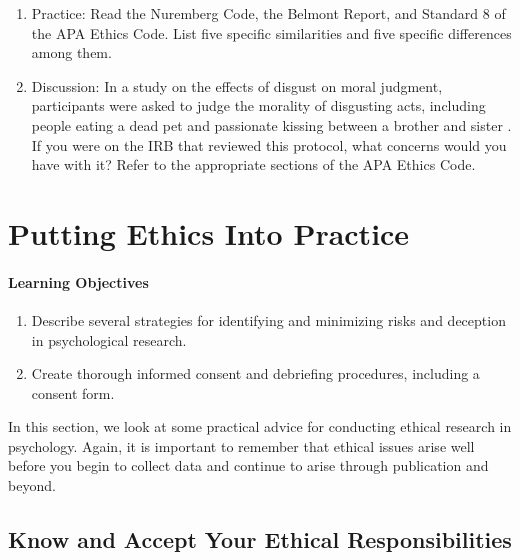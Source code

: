 \begin{fullwidth}

\begin{enumerate}

\item Practice: Read the Nuremberg Code, the Belmont Report, and Standard 8 of the APA Ethics Code. List five specific similarities and five specific differences among them.

\item Discussion: In a study on the effects of disgust on moral judgment, participants were asked to judge the morality of disgusting acts, including people eating a dead pet and passionate kissing between a brother and sister \citep{haidt_affect_1993}. If you were on the IRB that reviewed this protocol, what concerns would you have with it? Refer to the appropriate sections of the APA Ethics Code.

\end{enumerate}

\end{fullwidth}

\newpage
\section{Putting Ethics Into Practice}

  \paragraph{Learning Objectives}
  \begin{enumerate}
  \item Describe several strategies for identifying and minimizing risks and deception in psychological research.
   \item Create thorough informed consent and debriefing procedures, including a consent form.
  \end{enumerate}


In this section, we look at some practical advice for conducting ethical research in psychology. Again, it is important to remember that ethical issues arise well before you begin to collect data and continue to arise through publication and beyond.

\subsection{Know and Accept Your Ethical Responsibilities}


